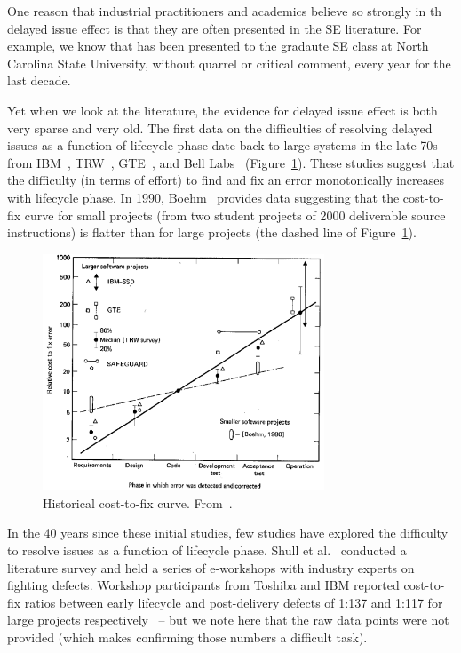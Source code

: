 One reason that industrial practitioners and academics believe so strongly in th delayed issue effect is that they are often presented in the SE literature. For example,
we know that  has been presented to the gradaute SE class at North Carolina State University, without quarrel or critical comment, every year for the last decade.

Yet when we look at the literature, the evidence for
delayed issue effect is both very sparse and very old.
The first data on the difficulties of resolving delayed issues as a function of lifecycle phase date back to large systems in the late 70s from IBM~\cite{Fagan76}, TRW~\cite{Boehm76}, GTE~\cite{Daly77}, and Bell Labs~\cite{Stephenson76} (Figure~\ref{fig:cost-to-fix}). These studies suggest that the difficulty (in terms of effort) to find and fix an error monotonically increases with lifecycle phase.  In 1990, Boehm~\cite{Boehm80} provides data suggesting that the cost-to-fix curve for small projects (from two student projects of 2000 deliverable source instructions) is flatter than for large projects (the dashed line of Figure~\ref{fig:cost-to-fix}).

\begin{figure}[!b]
 \includegraphics[width=3.3in]{img/boehm_cost-to-fix.png}
 \caption{Historical cost-to-fix curve. From~\cite{Boehm81}.}\label{fig:cost-to-fix}
 \end{figure}
 
In the 40 years since these initial studies, few studies have explored the difficulty to resolve issues
as a function of lifecycle phase. 
Shull et al.~\cite{Shull02} conducted a literature survey and held a series of e-workshops with industry experts on fighting defects. Workshop participants from Toshiba and IBM reported cost-to-fix ratios between early lifecycle and post-delivery defects of 1:137 and 1:117 for large projects respectively~\cite{Shull02} -- but we note here that the raw data points were not provided (which makes confirming those numbers 
a difficult task). 

